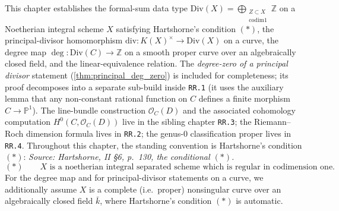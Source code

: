This chapter establishes the formal-sum data type
\(\mathrm{Div}(X) = \bigoplus_{\substack{Z \subset X \\ \mathrm{codim} 1}} \mathbb Z\) on a
Noetherian integral scheme \(X\) satisfying Hartshorne's condition \((*)\), the
principal-divisor homomorphism \(\mathrm{div} \colon K(X)^{\times} \to \mathrm{Div}(X)\) on a
curve, the degree map \(\deg \colon \mathrm{Div}(C) \to \mathbb Z\) on a smooth proper
curve over an algebraically closed field, and the linear-equivalence
relation. The \emph{degree-zero of a principal divisor} statement
(\ref{thm:principal_deg_zero}) is included for completeness; its proof
decomposes into a separate sub-build inside \texttt{RR.1} (it uses the
auxiliary lemma that any non-constant rational function on \(C\) defines a
finite morphism \(C \to \mathbb P^1\)). The line-bundle construction $\mathcal
O_C(D)$ and the associated cohomology computation $H^0(C, \mathcal O_C(D))$
live in the sibling chapter \texttt{RR.3}; the Riemann--Roch dimension
formula lives in \texttt{RR.2}; the genus-\(0\) classification proper lives in
\texttt{RR.4}.
Throughout this chapter, the standing convention is Hartshorne's condition
\((*)\):
\textit{Source: Hartshorne, II \S6, p.~130, the conditional \((*)\).}
\[
  (\ast)\qquad
  X \text{ is a noetherian integral separated scheme which is regular in
  codimension one.}
\]
For the degree map and for principal-divisor statements on a curve, we
additionally assume \(X\) is a complete (i.e.\ proper) nonsingular curve over
an algebraically closed field \(\bar k\), where Hartshorne's condition \((*)\) is
automatic.
